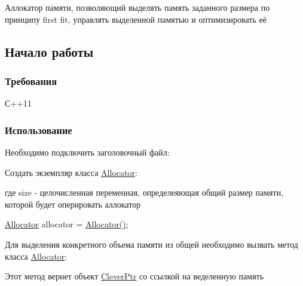 Аллокатор памяти, позволяющий выделять память заданного размера по принципу first fit, управлять выделенной памятью и оптимизировать её

\subsection*{Начало работы}

\subsubsection*{Требования}

С++11

\subsubsection*{Использование}

Необходимо подключить заголовочный файл\+: 
\begin{DoxyCode}{0}
\end{DoxyCode}
 Создать экземпляр класса \mbox{\hyperlink{class_allocator}{Allocator}}\+: 
\begin{DoxyCode}{0}
\end{DoxyCode}
 где size -\/ целочисленная переменная, определеяющая общий размер памяти, которой будет оперировать аллокатор 
\begin{DoxyCode}{0}
\end{DoxyCode}
 \mbox{\hyperlink{class_allocator}{Allocator}} allocator = \mbox{\hyperlink{class_allocator}{Allocator()}}; 
\begin{DoxyCode}{0}
\end{DoxyCode}
 Для выделения конкретного объема памяти из общей необходимо вызвать метод класса \mbox{\hyperlink{class_allocator}{Allocator}}\+: 
\begin{DoxyCode}{0}
\end{DoxyCode}
 Этот метод вернет объект \mbox{\hyperlink{class_clever_ptr}{Clever\+Ptr}} со ссылкой на веделенную память

